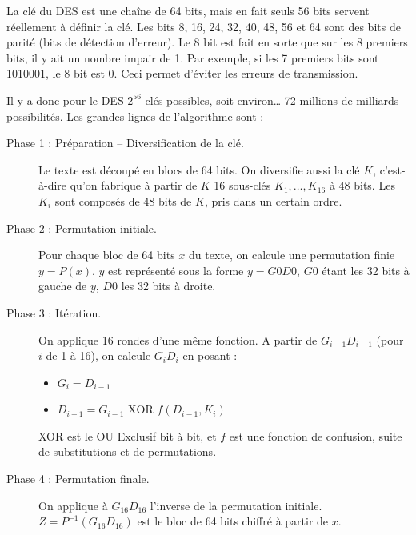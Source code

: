 \documentclass[a4paper,12pt]{article}
\begin{document}
La clé du DES est une chaîne de 64 bits, mais en fait seuls 56 bits servent réellement à définir la clé. Les bits 8, 16, 24, 32, 40, 48, 56 et 64 sont des bits de parité (bits de détection d'erreur). Le 8\ieme{} bit est fait en sorte que sur les 8 premiers bits, il y ait un nombre impair de 1. Par exemple, si les 7 premiers bits sont 1010001, le 8\ieme{} bit est 0. Ceci permet d'éviter les erreurs de transmission.

Il y a donc pour le DES $2^{56}$ clés possibles, soit environ\dots{} 72 millions de milliards possibilités. Les grandes lignes de l'algorithme sont :

\begin{description}
\item[Phase 1 : Préparation -- Diversification de la clé.] Le texte est décou\-pé en blocs de 64 bits. On diversifie aussi la clé $K$, c'est-à-dire qu'on fabrique à partir de $K$ 16 sous-clés $K_{1}, \dots{}, K_{16}$ à 48 bits. Les $K_{i}$ sont composés de 48 bits de $K$, pris dans un certain ordre.
\item[Phase 2 : Permutation initiale.] Pour chaque bloc de 64 bits $x$ du texte, on calcule une permutation finie $y=P(x)$. $y$ est représenté sous la forme $y=G0D0$, $G0$ étant les 32 bits à gauche de $y$, $D0$ les 32 bits à droite.
\item[Phase 3 : Itération.] On applique 16 rondes d'une même fonction. A partir de $G_{i-1}D_{i-1}$ (pour $i$ de 1 à 16), on calcule $G_{i}D_{i}$ en posant :
  \begin{itemize}
  \item $G_{i} = D_{i-1}$
  \item $D_{i-1} = G_{i-1} \textrm{ XOR } f(D_{i-1},K_{i})$
  \end{itemize}
  XOR est le OU Exclusif bit à bit, et $f$ est une fonction de confusion, suite de substitutions et de permutations.
\item[Phase 4 : Permutation finale.] On applique à $G_{16}D_{16}$ l'inverse de la permutation initiale. $Z = P^{-1}(G_{16}D_{16})$ est le bloc de 64 bits chiffré à partir de $x$.
\end{description}
\end{document}
